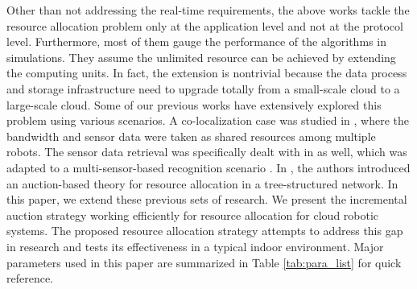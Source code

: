 \documentclass[journal]{IEEEtran}  %
\begin{document}
Other than not addressing the real-time requirements, the above works tackle
the resource allocation problem only at the application level and not at the
protocol level.
Furthermore, most of them gauge the performance of the algorithms in
simulations. 
They assume the unlimited resource can be achieved by extending the computing
units.  In fact, the extension is nontrivial because the data process and
storage infrastructure need to upgrade totally from a small-scale cloud to a
large-scale cloud. 
Some of our previous works have extensively explored this problem using
various scenarios. A co-localization case was studied in \cite{Lujia12Robio},
        where the bandwidth and sensor data were taken as shared resources
        among multiple robots.
The sensor data retrieval was specifically dealt with in
\cite{Lujia12Mfi,Lujia2015tase} as well, which was adapted to a
multi-sensor-based recognition scenario \cite{liu12dpfusion}.
In \cite{lujia2013icia}, the authors introduced an auction-based theory
for resource allocation in a tree-structured network.
In this paper, we extend these previous sets of research.
We present the incremental auction strategy working efficiently for resource
allocation for cloud robotic systems\cite{lujia2014icra}.
The proposed resource allocation strategy attempts to address this gap in
research and tests its effectiveness in a typical indoor environment.
Major parameters used in this paper are summarized in Table
\ref{tab:para_list} for quick reference. 
\end{document}
